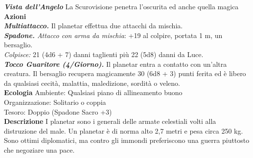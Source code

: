 \begin{multicols}{2}
\emph{\textbf{Vista dell'Angelo}} La Scurovisione penetra l'oscurita ed anche quella magica\\
\smallskip\textbf{Azioni}\\
\emph{\textbf{Multiattacco.}} Il planetar effettua due attacchi da mischia.\\
\emph{\textbf{Spadone.} Attacco con arma da mischia}: +19 al colpire, portata 1 m, un bersaglio.\\
\emph{Colpisce:} 21 (4d6 + 7) danni taglienti più 22 (5d8) danni da Luce.\\
\emph{\textbf{Tocco Guaritore (4/Giorno).}} Il planetar entra a contatto con un'altra creatura. Il bersaglio recupera magicamente 30 (6d8 + 3) punti ferita ed è libero da qualsiasi cecità, malattia, maledizione, sordità o veleno.\\
\textbf{Ecologia}
Ambiente: Qualsiasi piano di allineamento buono\\
Organizzazione: Solitario o coppia\\
Tesoro: Doppio (Spadone Sacro +3)\\
\textbf{Descrizione}
I planetar sono i generali delle armate celestiali volti alla distruzione del male. Un planetar è di norma alto 2,7 metri e pesa circa 250 kg. Sono ottimi diplomatici, ma contro gli immondi preferiscono una guerra piuttosto che negoziare una pace.\\


\end{multicols}
